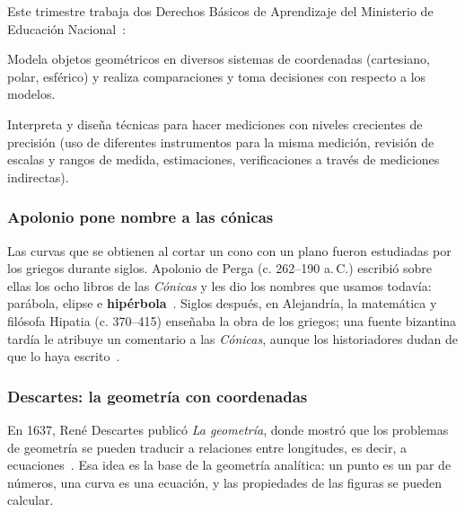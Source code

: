 \documentclass[11pt]{article}
\begin{document}
Este trimestre trabaja dos Derechos Básicos de Aprendizaje del Ministerio de
Educación Nacional~\cite{mendba}:

\begin{dba}
Modela objetos geométricos en diversos sistemas de coordenadas (cartesiano, polar,
esférico) y realiza comparaciones y toma decisiones con respecto a los modelos.
\end{dba}

\begin{dba}
Interpreta y diseña técnicas para hacer mediciones con niveles crecientes de
precisión (uso de diferentes instrumentos para la misma medición, revisión de
escalas y rangos de medida, estimaciones, verificaciones a través de mediciones
indirectas).
\end{dba}


\subsubsection*{Apolonio pone nombre a las cónicas}

Las curvas que se obtienen al cortar un cono con un plano fueron estudiadas por los
griegos durante siglos. Apolonio de Perga (c. 262--190 a.\,C.) escribió sobre ellas
los ocho libros de las \emph{Cónicas} y les dio los nombres que usamos todavía:
parábola, elipse e \textbf{hipérbola}~\cite{mactutorapolonio}. Siglos después, en
Alejandría, la matemática y filósofa Hipatia (c. 370--415) enseñaba la obra de los
griegos; una fuente bizantina tardía le atribuye un comentario a las \emph{Cónicas},
aunque los historiadores dudan de que lo haya escrito~\cite{mactutorhipatia}.

\subsubsection*{Descartes: la geometría con coordenadas}

En 1637, René Descartes publicó \emph{La geometría}, donde mostró que los problemas
de geometría se pueden traducir a relaciones entre longitudes, es decir, a
ecuaciones~\cite{descartes}. Esa idea es la base de la geometría analítica: un punto
es un par de números, una curva es una ecuación, y las propiedades de las figuras
se pueden calcular.
\end{document}
